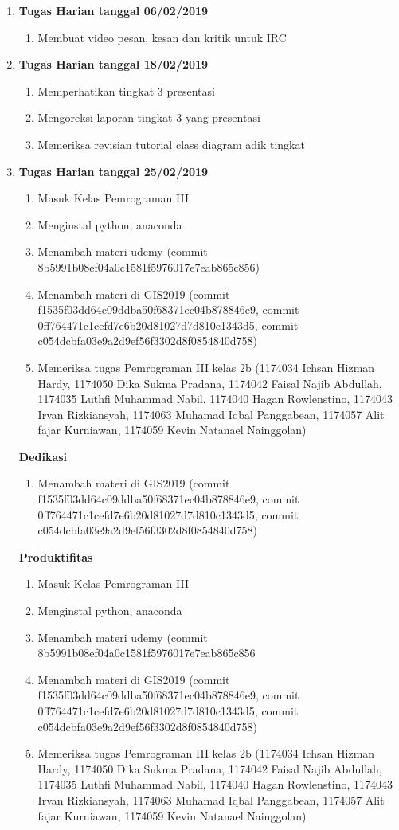 \begin{enumerate}
\item \textbf{Tugas Harian tanggal 06/02/2019}
\begin{enumerate}
\item Membuat video pesan, kesan dan kritik untuk IRC
\end{enumerate}

\item \textbf{Tugas Harian tanggal 18/02/2019}
\begin{enumerate}
\item Memperhatikan tingkat 3 presentasi
\item Mengoreksi laporan tingkat 3 yang presentasi
\item Memeriksa revisian tutorial class diagram adik tingkat
\end{enumerate}

\item \textbf{Tugas Harian tanggal 25/02/2019}
\begin{enumerate}
\item Masuk Kelas Pemrograman III
\item Menginstal python, anaconda
\item Menambah materi udemy (commit 8b5991b08ef04a0c1581f5976017e7eab865c856)
\item Menambah materi di GIS2019 (commit f1535f03dd64c09ddba50f68371ec04b878846e9, commit 0ff764471c1cefd7e6b20d81027d7d810c1343d5, commit c054dcbfa03e9a2d9ef56f3302d8f0854840d758)
\item Memeriksa tugas Pemrograman III kelas 2b (1174034 Ichsan Hizman Hardy, 1174050 Dika Sukma Pradana, 1174042 Faisal Najib Abdullah, 1174035 Luthfi Muhammad Nabil, 1174040 Hagan Rowlenstino, 1174043 Irvan Rizkiansyah, 1174063 Muhamad Iqbal Panggabean, 1174057 Alit fajar Kurniawan, 1174059 Kevin Natanael Nainggolan)
\end{enumerate}

\textbf{Dedikasi}
\begin{enumerate} 
\item  Menambah materi di GIS2019 (commit f1535f03dd64c09ddba50f68371ec04b878846e9, commit 0ff764471c1cefd7e6b20d81027d7d810c1343d5, commit c054dcbfa03e9a2d9ef56f3302d8f0854840d758)
\end{enumerate}

\textbf{Produktifitas}
\begin{enumerate}
\item Masuk Kelas Pemrograman III
\item Menginstal python, anaconda
\item Menambah materi udemy (commit 8b5991b08ef04a0c1581f5976017e7eab865c856
\item Menambah materi di GIS2019 (commit f1535f03dd64c09ddba50f68371ec04b878846e9, commit 0ff764471c1cefd7e6b20d81027d7d810c1343d5, commit c054dcbfa03e9a2d9ef56f3302d8f0854840d758)
\item Memeriksa tugas Pemrograman III kelas 2b (1174034 Ichsan Hizman Hardy, 1174050 Dika Sukma Pradana, 1174042 Faisal Najib Abdullah, 1174035 Luthfi Muhammad Nabil, 1174040 Hagan Rowlenstino, 1174043 Irvan Rizkiansyah, 1174063 Muhamad Iqbal Panggabean, 1174057 Alit fajar Kurniawan, 1174059 Kevin Natanael Nainggolan)
\end{enumerate}


\end{enumerate}
